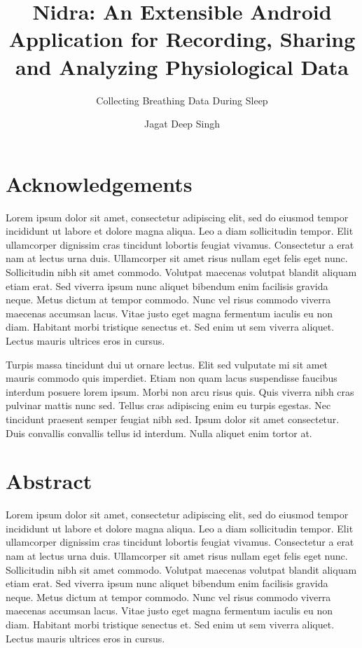 \documentclass[UKenglish]{ifimaster}  %
\title{Nidra: An Extensible Android Application for Recording, Sharing and Analyzing Physiological Data}
\subtitle{Collecting Breathing Data During Sleep}
\author{Jagat Deep Singh}
\begin{document}
\duoforside[dept={Department of Informatics},   %
  program={Programming and Networks},  %
  long]                                        %

\frontmatter{}
\chapter*{Acknowledgements}
    Lorem ipsum dolor sit amet, consectetur adipiscing elit, sed do eiusmod tempor incididunt ut labore et dolore magna aliqua. Leo a diam sollicitudin tempor. Elit ullamcorper dignissim cras tincidunt lobortis feugiat vivamus. Consectetur a erat nam at lectus urna duis. Ullamcorper sit amet risus nullam eget felis eget nunc. Sollicitudin nibh sit amet commodo. Volutpat maecenas volutpat blandit aliquam etiam erat. Sed viverra ipsum nunc aliquet bibendum enim facilisis gravida neque. Metus dictum at tempor commodo. Nunc vel risus commodo viverra maecenas accumsan lacus. Vitae justo eget magna fermentum iaculis eu non diam. Habitant morbi tristique senectus et. Sed enim ut sem viverra aliquet. Lectus mauris ultrices eros in cursus.

    Turpis massa tincidunt dui ut ornare lectus. Elit sed vulputate mi sit amet mauris commodo quis imperdiet. Etiam non quam lacus suspendisse faucibus interdum posuere lorem ipsum. Morbi non arcu risus quis. Quis viverra nibh cras pulvinar mattis nunc sed. Tellus cras adipiscing enim eu turpis egestas. Nec tincidunt praesent semper feugiat nibh sed. Ipsum dolor sit amet consectetur. Duis convallis convallis tellus id interdum. Nulla aliquet enim tortor at.

\chapter*{Abstract}
    Lorem ipsum dolor sit amet, consectetur adipiscing elit, sed do eiusmod tempor incididunt ut labore et dolore magna aliqua. Leo a diam sollicitudin tempor. Elit ullamcorper dignissim cras tincidunt lobortis feugiat vivamus. Consectetur a erat nam at lectus urna duis. Ullamcorper sit amet risus nullam eget felis eget nunc. Sollicitudin nibh sit amet commodo. Volutpat maecenas volutpat blandit aliquam etiam erat. Sed viverra ipsum nunc aliquet bibendum enim facilisis gravida neque. Metus dictum at tempor commodo. Nunc vel risus commodo viverra maecenas accumsan lacus. Vitae justo eget magna fermentum iaculis eu non diam. Habitant morbi tristique senectus et. Sed enim ut sem viverra aliquet. Lectus mauris ultrices eros in cursus.
\end{document}
